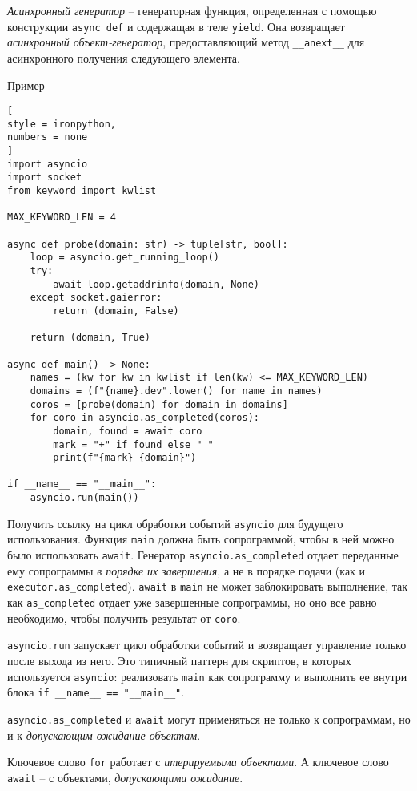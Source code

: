 \documentclass[%
	11pt,
	a4paper,
	utf8,
		]{article}
\begin{document}
\emph{Асинхронный генератор} -- генераторная функция, определенная с помощью конструкции \verb*|async def| и содержащая в теле \verb|yield|. Она возвращает \emph{асинхронный объект-генератор}, предоставляющий метод \verb*|__anext__| для асинхронного получения следующего элемента.

Пример
\begin{lstlisting}[
style = ironpython,
numbers = none
]
import asyncio
import socket
from keyword import kwlist

MAX_KEYWORD_LEN = 4

async def probe(domain: str) -> tuple[str, bool]:
    loop = asyncio.get_running_loop()
    try:
        await loop.getaddrinfo(domain, None)
    except socket.gaierror:
        return (domain, False)
    
    return (domain, True)
    
async def main() -> None:
    names = (kw for kw in kwlist if len(kw) <= MAX_KEYWORD_LEN)
    domains = (f"{name}.dev".lower() for name in names)
    coros = [probe(domain) for domain in domains]
    for coro in asyncio.as_completed(coros):
        domain, found = await coro
        mark = "+" if found else " "
        print(f"{mark} {domain}")

if __name__ == "__main__":
    asyncio.run(main())
\end{lstlisting}

Получить ссылку на цикл обработки событий \verb|asyncio| для будущего использования. Функция \verb*|main| должна быть сопрограммой, чтобы в ней можно было использовать \verb|await|. Генератор \verb*|asyncio.as_completed| отдает переданные ему сопрограммы \emph{в порядке их завершения}, а не в порядке подачи (как и \verb|executor.as_completed|). \verb|await| в \verb*|main| не может заблокировать выполнение, так как \verb|as_completed| отдает уже завершенные сопрограммы, но оно все равно необходимо, чтобы получить результат от \verb*|coro|.

\verb*|asyncio.run| запускает цикл обработки событий и возвращает управление только после выхода из него. Это типичный паттерн для скриптов, в которых используется \verb|asyncio|: реализовать \verb*|main| как сопрограмму и выполнить ее внутри блока \verb|if __name__ == "__main__"|.

\verb*|asyncio.as_completed| и \verb|await| могут применяться не только к сопрограммам, но и к \emph{допускающим ожидание объектам}.

Ключевое слово \verb*|for| работает с \emph{итерируемыми объектами}. А ключевое слово \verb*|await| -- с объектами, \emph{допускающими ожидание}.
\end{document}

